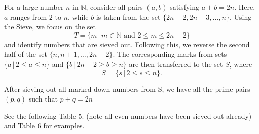 \documentclass{aomart}
\begin{document}
For a large number \( n \) in \( \mathbb{N} \), consider all pairs \( (a,b) \) satisfying \( a+b = 2n \). Here, \( a \) ranges from \( 2 \) to \( n \), while \( b \) is taken from the set \( \{2n-2, 2n-3, \ldots, n\} \). Using the Sieve, we focus on the set 
\[ 
T = \{ m \,|\, m \in \mathbb{N} \text{ and } 2 \leq m \leq 2n-2 \}
\]
and identify numbers that are sieved out. Following this, we reverse the second half of the set \( \{ n, n+1, \ldots, 2n-2 \} \). The corresponding marks from sets \( \{ a \,|\, 2 \leq a \leq n \} \) and \( \{ b \,|\, 2n-2 \geq b \geq n \} \) are then transferred to the set \( S \), where 
\[ 
S = \{ s \,|\, 2 \leq s \leq n \}.
\]


\vspace{1\baselineskip}

After sieving out all marked down numbers from S, we have all the prime pairs \( (p,q)\) { }such that \( p+q = 2n\)

\vspace{1\baselineskip}

See the following Table 5. (note all even numbers have been sieved out already) and Table 6 for examples.
\end{document}
